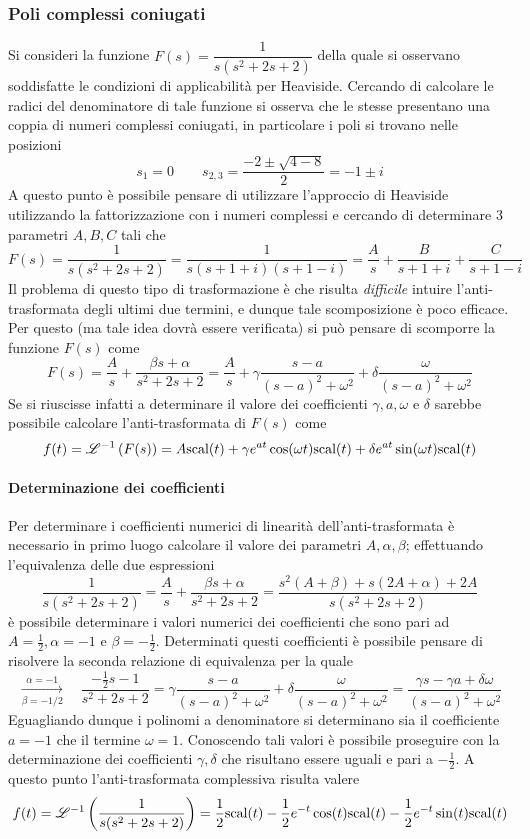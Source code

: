 		\subsubsection{Poli complessi coniugati}
			Si consideri la funzione $F(s) = \dfrac{1}{s(s^2+2s+2)}	$ della quale si osservano soddisfatte le condizioni di applicabilità per Heaviside. Cercando di calcolare le radici del denominatore di tale funzione si osserva che le stesse presentano una coppia di numeri complessi coniugati, in particolare i poli si trovano nelle posizioni
			\[ s_1 = 0 \qquad s_{2,3} = \frac{-2\pm \sqrt{4-8}}{2} = -1\pm i\]
			A questo punto è possibile pensare di utilizzare l'approccio di Heaviside utilizzando la fattorizzazione con i numeri complessi e cercando di determinare 3 parametri $A,B,C$ tali che
			\[F(s) = \dfrac{1}{s(s^2+2s+2)} = \frac{1}{s(s+1+i)(s+1-i)} = \frac A s + \frac{B}{s+1+i} + \frac{C}{s+1-i}\]
			Il problema di questo tipo di trasformazione è che risulta \textit{difficile} intuire l'anti-trasformata degli ultimi due termini, e dunque tale scomposizione è poco efficace. Per questo (ma tale idea dovrà essere verificata) si può pensare di scomporre la funzione $F(s)$ come
			\[F(s) = \frac A s + \frac{\beta s + \alpha}{s^2+2s+2} = \frac A s + \gamma \frac{s-a}{(s-a)^2+\omega^2} +\delta \frac{\omega}{(s-a)^2+\omega^2} \]
			Se si riuscisse infatti a determinare il valore dei coefficienti $\gamma,a,\omega$ e $\delta$ sarebbe possibile calcolare l'anti-trasformata di $F(s)$ come
			\[f(t) = \mathscr {L}^{-1} \left( F(s) \right) = A \textrm{scal}(t) + \gamma e^{at}\cos(\omega t) \textrm{scal}(t) + \delta e^{at} \sin(\omega t)\textrm{scal}(t)\]
			
			\paragraph{Determinazione dei coefficienti} Per determinare i coefficienti numerici di linearità dell'anti-trasformata è necessario in primo luogo calcolare il valore dei parametri $A,\alpha,\beta$; effettuando l'equivalenza delle due espressioni
			\[\frac{1}{s(s^2+2s+2)}  = \frac A s + \frac{\beta s + \alpha}{s^2+2s+2} = \frac{s^2(A+\beta) + s(2A+\alpha) + 2A}{s(s^2+2s+2)}\]
			è possibile determinare i valori numerici dei coefficienti che sono pari ad $A=\frac 1 2,\alpha = -1$ e $\beta = - \frac 1 2$. Determinati questi coefficienti è possibile pensare di risolvere la seconda relazione di equivalenza per la quale
			\[ \xrightarrow[\beta = - 1/2]{\alpha = -1} \quad \frac{-\frac 1 2 s - 1}{s^2+2s+2} = \gamma \frac{s-a}{(s-a)^2+\omega^2} +\delta \frac{\omega}{(s-a)^2+\omega^2} = \frac{\gamma s -\gamma a + \delta \omega }{(s-a)^2+\omega^2} \]
			Eguagliando dunque i polinomi a denominatore si determinano sia il coefficiente $a = -1$ che il termine $\omega= 1$. Conoscendo tali valori è possibile proseguire con la determinazione dei coefficienti $\gamma,\delta$ che risultano essere uguali e pari a $-\frac 1 2$. A questo punto l'anti-trasformata complessiva risulta valere
			\[f(t) = \mathscr {L}^{-1} \left( \frac{1}{s(s^2+2s+2)} \right) = \frac 1 2 \textrm{scal}(t) -\frac 1 2 e^{-t}\cos(t)\textrm{scal}(t) - \frac 1 2 e^{-t}\sin(t)\textrm{scal}(t)  \]
			
			
			
			
			
			
			
			